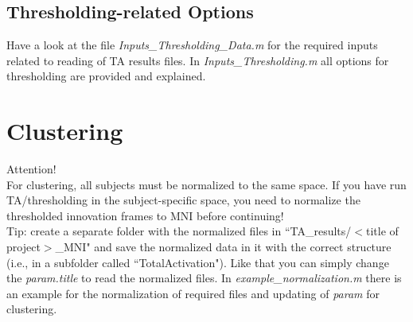 \documentclass{article}
\begin{document}
\subsection{Thresholding-related Options}
Have a look at the file \textit{Inputs\_Thresholding\_Data.m} for the required inputs related to reading of TA results files. In \textit{Inputs\_Thresholding.m} all options for thresholding are provided and explained.


\section{Clustering}
\color{red}
Attention!\\
For clustering, all subjects must be normalized to the same space. If you have run TA/thresholding in the subject-specific space, you need to normalize the thresholded innovation frames to MNI before continuing!\\
Tip: create a separate folder with the normalized files in ``TA\_results/$<$title of project$>$\_MNI" and save the normalized data in it with the correct structure (i.e., in a subfolder called ``TotalActivation"). Like that you can simply change the \textit{param.title} to read the normalized files. In \textit{example\_normalization.m} there is an example for the normalization of required files and updating of \textit{param} for clustering.\\\\
\color{black}
%
\end{document}
